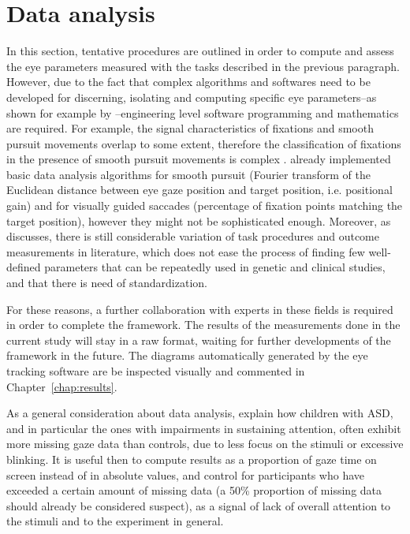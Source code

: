 \section{Data analysis}
\label{sec:fwkdataanalysis}

In this section, tentative procedures are outlined in order to compute and assess the eye parameters measured with the tasks described in the previous paragraph. However, due to the fact that complex algorithms and softwares need to be developed for discerning, isolating and computing specific eye parameters–as shown for example by \cite{giordano2017eyetrackersystem,jansson2013smoothpursuit,larsson2015detection}–engineering level software programming and mathematics are required. For example, the signal characteristics of fixations and smooth pursuit movements overlap to some extent, therefore the classification of fixations in the presence of smooth pursuit movements is complex \citep{larsson2015detection}. \cite{giordano2017eyetrackersystem} already implemented basic data analysis algorithms for smooth pursuit (Fourier transform of the Euclidean distance between eye gaze position and target position, i.e. positional gain) and for visually guided saccades (percentage of fixation points matching the target position), however they might not be sophisticated enough. Moreover, as \cite{smyrnis2008guidelines} discusses, there is still considerable variation of task procedures and outcome measurements in literature, which does not ease the process of finding few well-defined parameters that can be repeatedly used in genetic and clinical studies, and that there is need of standardization.

For these reasons, a further collaboration with experts in these fields is required in order to complete the framework. The results of the measurements done in the current study will stay in a raw format, waiting for further developments of the framework in the future. The diagrams automatically generated by the eye tracking software are be inspected visually and commented in Chapter~\ref{chap:results}.

As a general consideration about data analysis, \cite{sasson2012children} explain how children with ASD, and in particular the ones with impairments in sustaining attention, often exhibit more missing gaze data than controls, due to less focus on the stimuli or excessive blinking. It is useful then to compute results as a proportion of gaze time on screen instead of in absolute values, and control for participants who have exceeded a certain amount of missing data (a 50\% proportion of missing data should already be considered suspect), as a signal of lack of overall attention to the stimuli and to the experiment in general.


